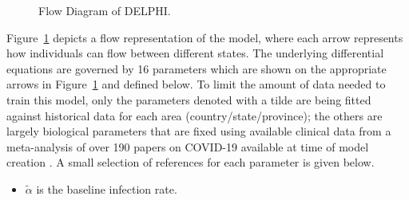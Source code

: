 \documentclass[msom,blindrev]{informs3} %
\begin{document}
\begin{APPENDICES}
\begin{figure}[t]
{
}
\caption{Flow Diagram of DELPHI.}
\label{fig:DELPHI}
\end{figure}
Figure~\ref{fig:DELPHI} depicts a flow representation of the model, where each arrow represents how individuals can flow between different states.
The underlying differential equations are governed by 16 parameters which are shown on the appropriate arrows in Figure~\ref{fig:DELPHI} and defined below. To limit the amount of data needed to train this model, only the parameters denoted with a tilde are being fitted against historical data for each area (country/state/province); the others are largely biological parameters that are fixed using available clinical data from a meta-analysis of over 190 papers on COVID-19 available at time of model creation . A small selection of references for each parameter is given below.
\begin{itemize}[topsep=0pt,itemsep=0pt]
    \item $\widetilde{\alpha}$ is the baseline infection rate. 


\end{itemize}
\end{APPENDICES}
\end{document}
